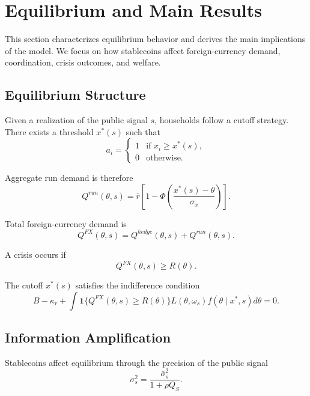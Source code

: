 \section{Equilibrium and Main Results}

This section characterizes equilibrium behavior and derives the main implications of the model. We focus on how stablecoins affect foreign-currency demand, coordination, crisis outcomes, and welfare.

\subsection{Equilibrium Structure}

Given a realization of the public signal $s$, households follow a cutoff strategy. There exists a threshold $x^*(s)$ such that
\begin{equation}
a_i = \begin{cases}
1 & \text{if } x_i \ge x^*(s), \\
0 & \text{otherwise}.
\end{cases}
\end{equation}

Aggregate run demand is therefore
\begin{equation}
Q^{run}(\theta, s) = \bar r \left[1 - \Phi\left(\frac{x^*(s) - \theta}{\sigma_x}\right)\right].
\end{equation}

Total foreign-currency demand is
\begin{equation}
Q^{FX}(\theta, s) = Q^{hedge}(\theta, s) + Q^{run}(\theta, s).
\end{equation}

A crisis occurs if
\begin{equation}
Q^{FX}(\theta, s) \ge R(\theta).
\end{equation}

The cutoff $x^*(s)$ satisfies the indifference condition
\begin{equation}
B - \kappa_r + \int \mathbf{1}\{Q^{FX}(\theta,s) \ge R(\theta)\} L(\theta, \omega_s) f(\theta \mid x^*, s) d\theta = 0.
\end{equation}

\subsection{Information Amplification}

Stablecoins affect equilibrium through the precision of the public signal
\begin{equation}
\sigma_s^2 = \frac{\bar\sigma_s^2}{1 + \rho Q_S}.
\end{equation}

